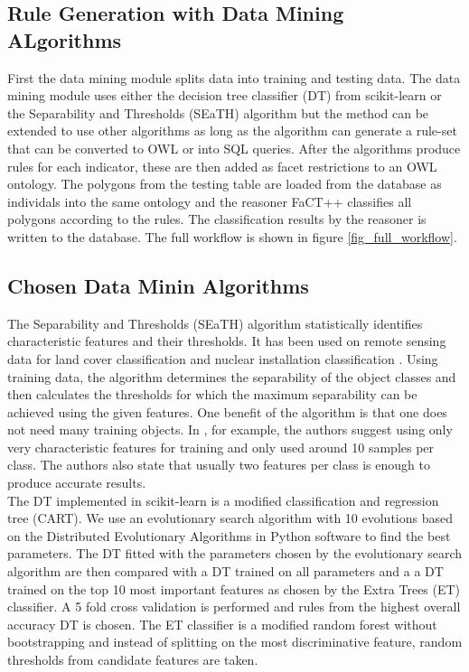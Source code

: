 \documentclass[authoryear, review,12pt,number]{elsarticle}
\begin{document}
\subsection{Rule Generation with Data Mining ALgorithms}
First the data mining module splits data into training and testing data. 
The data mining module uses either the decision tree classifier (DT) from 
scikit-learn \citep{scikit-learn} or the Separability and Thresholds (SEaTH)
algorithm \citep{Nussbaum2006} but the method can be extended to use other
algorithms as long as the algorithm can generate a rule-set that can be
converted to OWL or into SQL queries. After the algorithms produce rules for 
each indicator, these are then added as facet restrictions to an OWL ontology. 
The polygons from the testing table are loaded from the database as individals 
into the same ontology and the reasoner FaCT++ classifies all 
polygons according to the rules. The classification  results by the reasoner 
is written to the database. The full workflow is shown in  figure 
\ref{fig_full_workflow}.
\subsection{Chosen Data Minin Algorithms}
The Separability and Thresholds (SEaTH) algorithm \citep{Nussbaum2006}
statistically identifies characteristic features and their thresholds. It has
been used on remote sensing data for land cover classification \citep{Gao2011}
and nuclear installation classification \citep{Nussbaum2006}. Using training
data, the algorithm determines the separability of the object classes and then
calculates the thresholds for which the maximum separability can be achieved
using the given features. One benefit of the algorithm is that one does not
need many training objects. In \cite{Nussbaum2006}, for example, the authors
suggest using only very characteristic features for training and only used
around 10 samples per class. The authors also state that usually two features
per class is enough to produce accurate results.\\
The DT implemented in scikit-learn is a modified classification and regression 
tree (CART)\citep{scikit-learn}. We use an evolutionary search 
algorithm with 10 evolutions based on the Distributed Evolutionary Algorithms 
in Python \citep{DEAP_JMLR2012} software to find the best parameters. The 
DT fitted with the parameters chosen by the evolutionary search algorithm 
are then compared with a DT trained on all parameters and 
a a DT trained on the top 10 most important features as chosen by the Extra 
Trees (ET) classifier. A 5 fold cross validation is performed and rules from 
the highest overall accuracy DT is chosen. The ET classifier is a modified 
random forest without bootstrapping and instead of splitting on the most 
discriminative feature, random thresholds from candidate features are taken.
\end{document}
